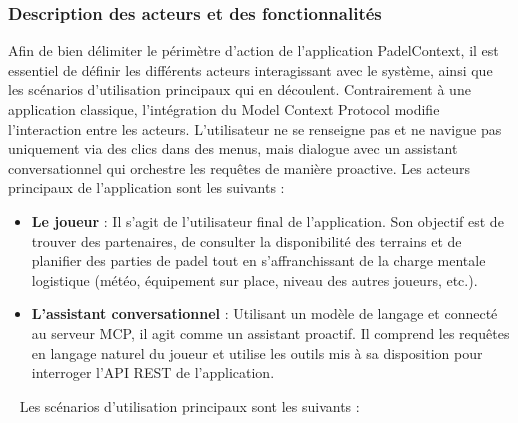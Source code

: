 \documentclass[12pt]{article}
\begin{document}
\subsubsection{Description des acteurs et des fonctionnalités}
Afin de bien délimiter le périmètre d'action de l'application PadelContext, il est essentiel de définir les différents acteurs interagissant avec le système, ainsi que les scénarios d'utilisation principaux qui en découlent. Contrairement à une application classique, l'intégration du Model Context Protocol modifie l'interaction entre les acteurs. L'utilisateur ne se renseigne pas et ne navigue pas uniquement via des clics dans des menus, mais dialogue avec un assistant conversationnel qui orchestre les requêtes de manière proactive.
\newline\newline
Les acteurs principaux de l'application sont les suivants :
\newline
\begin{itemize}
\item \textbf{Le joueur} : Il s'agit de l'utilisateur final de l'application. Son objectif est de trouver des partenaires, de consulter la disponibilité des terrains et de planifier des parties de padel tout en s'affranchissant de la charge mentale logistique (météo, équipement sur place, niveau des autres joueurs, etc.).
\item \textbf{L'assistant conversationnel} : Utilisant un modèle de langage et connecté au serveur MCP, il agit comme un assistant proactif. Il comprend les requêtes en langage naturel du joueur et utilise les outils mis à sa disposition pour interroger l'API REST de l'application.
\end{itemize}\
\newline
Les scénarios d'utilisation principaux sont les suivants :
\newline
\end{document}
